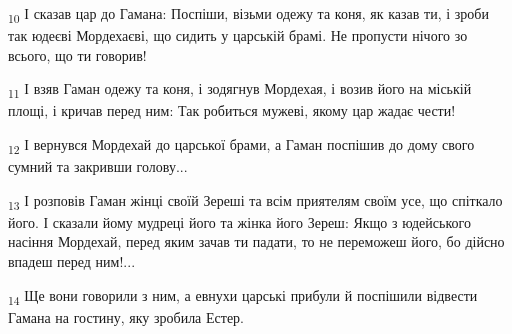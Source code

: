 \begin{tcolorbox}
\textsubscript{10} І сказав цар до Гамана: Поспіши, візьми одежу та коня, як казав ти, і зроби так юдеєві Мордехаєві, що сидить у царській брамі. Не пропусти нічого зо всього, що ти говорив!
\end{tcolorbox}
\begin{tcolorbox}
\textsubscript{11} І взяв Гаман одежу та коня, і зодягнув Мордехая, і возив його на міській площі, і кричав перед ним: Так робиться мужеві, якому цар жадає чести!
\end{tcolorbox}
\begin{tcolorbox}
\textsubscript{12} І вернувся Мордехай до царської брами, а Гаман поспішив до дому свого сумний та закривши голову...
\end{tcolorbox}
\begin{tcolorbox}
\textsubscript{13} І розповів Гаман жінці своїй Зереші та всім приятелям своїм усе, що спіткало його. І сказали йому мудреці його та жінка його Зереш: Якщо з юдейського насіння Мордехай, перед яким зачав ти падати, то не переможеш його, бо дійсно впадеш перед ним!...
\end{tcolorbox}
\begin{tcolorbox}
\textsubscript{14} Ще вони говорили з ним, а евнухи царські прибули й поспішили відвести Гамана на гостину, яку зробила Естер.
\end{tcolorbox}
